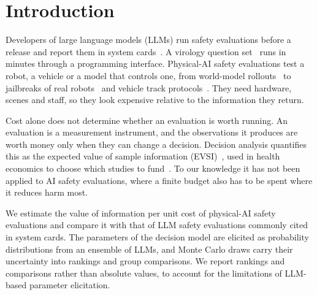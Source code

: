 \section{Introduction}
\label{sec:intro}

Developers of large language models (LLMs) run safety evaluations before a release and report them in system cards~\citep{shevlane2023extreme,anthropic2026rsp,openai2025preparedness}. A virology question set~\citep{vct-paper} runs in minutes through a programming interface. Physical-AI safety evaluations test a robot, a vehicle or a model that controls one, from world-model rollouts~\citep{geminirobotics2025veo} to jailbreaks of real robots~\citep{robey2024robopair} and vehicle track protocols~\citep{iihs_paeb}. They need hardware, scenes and staff, so they look expensive relative to the information they return.

Cost alone does not determine whether an evaluation is worth running. An evaluation is a measurement instrument, and the observations it produces are worth money only when they can change a decision. Decision analysis quantifies this as the expected value of sample information (EVSI)~\citep{raiffa1961applied,howard1966information}, used in health economics to choose which studies to fund~\citep{claxton1999irrelevance}. To our knowledge it has not been applied to AI safety evaluations, where a finite budget also has to be spent where it reduces harm most.

We estimate the value of information per unit cost of \voiNPhysical{} physical-AI safety evaluations and compare it with that of \voiNLLM{} LLM safety evaluations commonly cited in system cards. The parameters of the decision model are elicited as probability distributions from an ensemble of \voiNMembers{} LLMs, and Monte Carlo draws carry their uncertainty into rankings and group comparisons. We report rankings and comparisons rather than absolute values, to account for the limitations of LLM-based parameter elicitation.
